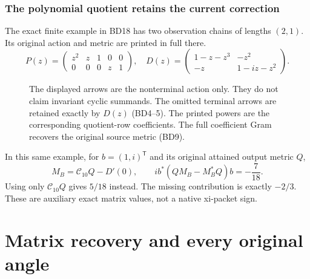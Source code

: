 \documentclass[11pt]{article}
\begin{document}
\section*{The polynomial quotient retains the current correction}
The exact finite example in BD18 has two observation chains of lengths
$(2,1)$. Its original action and metric are printed in full there.
\[
 P(z)=\begin{pmatrix}z^2&z&1&0&0\\0&0&0&z&1\end{pmatrix},
\quad
 D(z)=\begin{pmatrix}1-z-z^3&-z^2\\-z&1-iz-z^2\end{pmatrix}.
\]
\begin{figure}[H]\centering
{}
\caption{The displayed arrows are the nonterminal action only.
They do not claim invariant cyclic summands.
The omitted terminal arrows are retained exactly by $D(z)$ (BD4--5).
The printed powers are the corresponding quotient-row coefficients.
The full coefficient Gram recovers the original source metric (BD9).}
\end{figure}
In this same example, for $b=(1,i)^{\mathsf T}$ and its original
attained output metric $Q$,
\[
 M_B=\mathcal C_{10}Q-D'(0),\qquad
 i b^*(QM_B-M_B^*Q)b=-\frac7{18}.
\]
Using only $\mathcal C_{10}Q$ gives $5/18$ instead.
The missing contribution is exactly $-2/3$.
These are auxiliary exact matrix values, not a native xi-packet sign.
\clearpage

\clearpage\part{Matrix recovery and every original angle}
\end{document}
